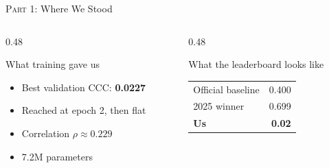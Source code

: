 \documentclass[aspectratio=169]{beamer}
\newcommand{\hl}[1]{\textcolor{coolpurple}{\textbf{#1}}}
\begin{document}

	\begin{frame}{\textsc{Part 1:} Where We Stood}
		\begin{columns}[onlytextwidth]
			\begin{column}{0.48\textwidth}
				\begin{alertblock}{What training gave us}
					\small
					\begin{itemize}
						\item Best validation CCC: \hl{0.0227}
						\item Reached at epoch 2, then flat
						\item Correlation $\rho \approx 0.229$
						\item 7.2M parameters
					\end{itemize}
				\end{alertblock}
			\end{column}
			\begin{column}{0.48\textwidth}
				\begin{block}{What the leaderboard looks like}
					\small
					\begin{tabular}{lr}
						Official baseline & 0.400 \\
						2025 winner & 0.699 \\
						\hline
						\textbf{Us} & \textbf{0.02} \\
					\end{tabular}
				\end{block}
			\end{column}
		\end{columns}
		\vspace{0.6em}
		\begin{center}
		\end{center}
	\end{frame}

\end{document}
